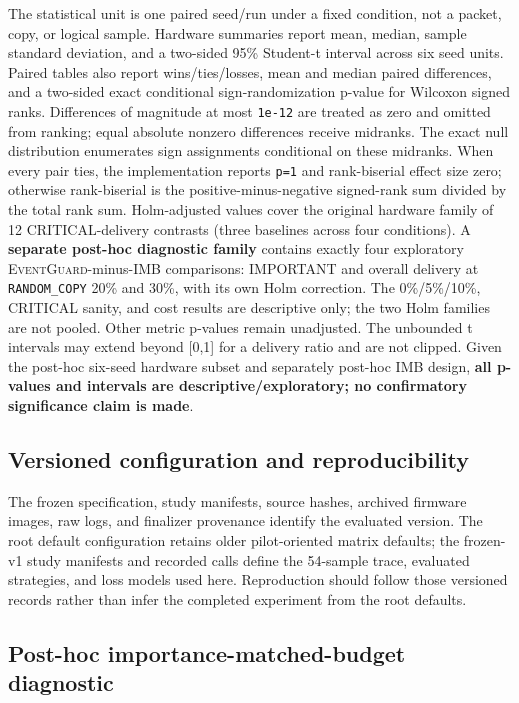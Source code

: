 \documentclass[11pt]{article}
\newcommand{\EG}{\textsc{EventGuard}}
\begin{document}
The statistical unit is one paired seed/run under a fixed condition, not a packet, copy, or logical sample. Hardware summaries report mean, median, sample standard deviation, and a two-sided 95\% Student-t interval across six seed units. Paired tables also report wins/ties/losses, mean and median paired differences, and a two-sided exact conditional sign-randomization p-value for Wilcoxon signed ranks. Differences of magnitude at most \texttt{1e-12} are treated as zero and omitted from ranking; equal absolute nonzero differences receive midranks. The exact null distribution enumerates sign assignments conditional on these midranks. When every pair ties, the implementation reports \texttt{p=1} and rank-biserial effect size zero; otherwise rank-biserial is the positive-minus-negative signed-rank sum divided by the total rank sum. Holm-adjusted values cover the original hardware family of 12 CRITICAL-delivery contrasts (three baselines across four conditions). A \textbf{separate post-hoc diagnostic family} contains exactly four exploratory \EG{}-minus-IMB comparisons: IMPORTANT and overall delivery at \texttt{RANDOM\_COPY} 20\% and 30\%, with its own Holm correction. The 0\%/5\%/10\%, CRITICAL sanity, and cost results are descriptive only; the two Holm families are not pooled. Other metric p-values remain unadjusted. The unbounded t intervals may extend beyond [0,1] for a delivery ratio and are not clipped. Given the post-hoc six-seed hardware subset and separately post-hoc IMB design, \textbf{all p-values and intervals are descriptive/exploratory; no confirmatory significance claim is made}.

\subsection{Versioned configuration and reproducibility}\label{sec:versioned-configuration}

The frozen specification, study manifests, source hashes, archived firmware images, raw logs, and finalizer provenance identify the evaluated version. The root default configuration retains older pilot-oriented matrix defaults; the frozen-v1 study manifests and recorded calls define the 54-sample trace, evaluated strategies, and loss models used here. Reproduction should follow those versioned records rather than infer the completed experiment from the root defaults.

\subsection{Post-hoc importance-matched-budget diagnostic}\label{sec:imb-method}
\end{document}
